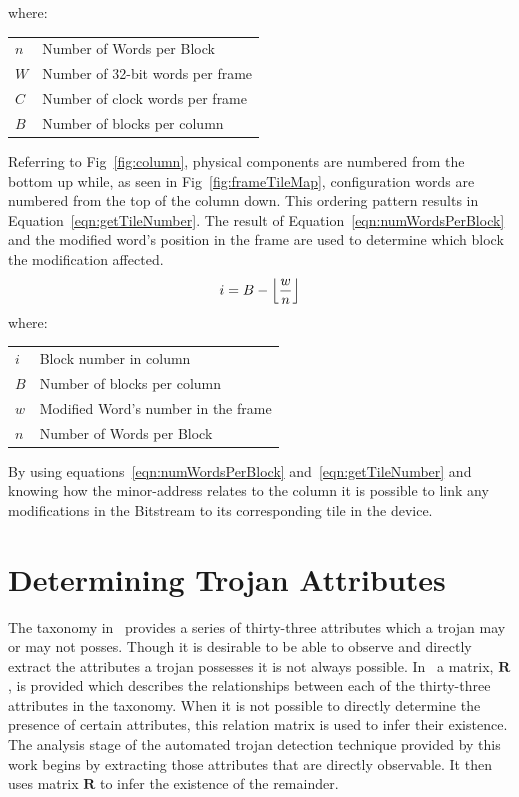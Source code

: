 \documentclass[journal, hidelinks]{IEEEtran}
\makeatletter
\newenvironment{conditions}
{\par\vspace{\abovedisplayskip}\noindent\begin{tabular}{>{$}l<{$} @{${}={}$} l}}
{\end{tabular}\par\vspace{\belowdisplayskip}}
\makeatother
\begin{document}
where:
\begin{conditions}
	n     &  Number of Words per Block \\
	W     &  Number of 32-bit words per frame \\   
	C     &  Number of clock words per frame \\
	B     &  Number of blocks per column
\end{conditions}
Referring to Fig~\ref{fig:column}, physical components are numbered from the bottom up while, as seen in Fig~\ref{fig:frameTileMap}, configuration words are numbered from the top of the column down.
This ordering pattern results in Equation~\ref{eqn:getTileNumber}.
The result of Equation~\ref{eqn:numWordsPerBlock} and the modified word's position in the frame are used to determine which block the modification affected.
\begin{equation} \label{eqn:getTileNumber}
i = B - \floor*{\frac{w}{n}}
\end{equation}
where:
\begin{conditions}
	i     &  Block number in column\\
	B     &  Number of blocks per column \\
	w     &  Modified Word's number in the frame\\
	n     &  Number of Words per Block 
\end{conditions}
By using equations~\ref{eqn:numWordsPerBlock} and~\ref{eqn:getTileNumber} and knowing how the minor-address relates to the column it is possible to link any modifications in the Bitstream to its corresponding tile in the device.


\section{Determining Trojan Attributes} \label{sec:trojanAttributes}
The taxonomy in~\cite{samerAttribute} provides a series of thirty-three attributes which a trojan may or may not posses.
Though it is desirable to be able to observe and directly extract the attributes a trojan possesses it is not always possible. 
In~\cite{samerAttribute} a matrix, $\mathbf{R}$, is provided which describes the relationships between each of the thirty-three attributes in the taxonomy.
When it is not possible to directly determine the presence of certain attributes, this relation matrix is used to infer their existence.
The analysis stage of the automated trojan detection technique provided by this work begins by extracting those attributes that are directly observable.
It then uses matrix $\mathbf{R}$ to infer the existence of the remainder. 
\end{document}
